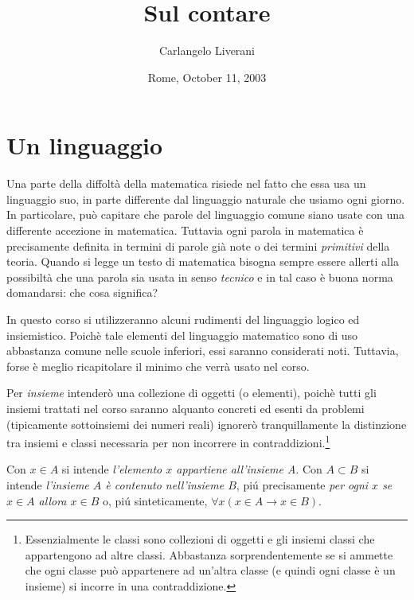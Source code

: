 \documentclass{amsart}
\begin{document}
\title{\bfseries Sul contare}
\author{Carlangelo Liverani}
\address{Dipartimento di Matematica\\
Universit\`{a} di Roma (Tor Vergata)\\
Via della Ricerca Scientifica, 00133 Roma, Italy\\
{\tt liverani@mat.uniroma2.it}}
\date{Rome, October 11, 2003}
\maketitle


\section{Un linguaggio}\label{sec:zero}
Una parte della diffolt\`a della matematica risiede nel fatto che essa
usa un linguaggio suo, in parte differente dal linguaggio naturale che
usiamo ogni giorno. In particolare, pu\`o capitare che parole del
linguaggio comune siano usate con una differente accezione in
matematica. Tuttavia ogni parola in matematica \`e precisamente
definita in termini di parole gi\`a note o dei termini {\em primitivi}
della teoria. Quando si legge un testo di matematica bisogna sempre
essere allerti alla possibilt\`a che una parola sia usata in senso
{\em tecnico} e in tal caso \`e buona norma domandarsi: che cosa
significa?


In questo corso si utilizzeranno
alcuni rudimenti del linguaggio logico  ed insiemistico. Poich\`e tale
elementi del linguaggio matematico sono di
uso abba\-stanza comune nelle scuole inferiori, essi saranno considerati
noti. Tuttavia, forse \`e meglio ricapitolare il minimo che verr\`a
usato nel corso. 

Per \emph{insieme} intender\`o una collezione di oggetti (o elementi),
poich\`e tutti gli 
insiemi trattati nel corso saranno alquanto concreti ed esenti da
problemi (tipicamente sottoinsiemi dei numeri reali) ignorer\`o
tranquillamente la distinzione tra insiemi e classi necessaria per non incorrere in
contraddizioni.\footnote{Essenzialmente le classi sono 
collezioni di oggetti e gli insiemi classi che appartengono ad altre
classi. Abbastanza sorprendentemente se si ammette che ogni classe pu\`o
appartenere ad un'altra classe (e quindi ogni classe \`e un insieme)
si incorre in una contraddizione.} 

Con $x\in A$ si intende
\emph{l'elemento $x$ appartiene all'insieme A}. Con $A\subset B$ si
intende \emph{l'insieme $A$ \`e contenuto nell'insieme $B$}, pi\'u
precisamente \emph{per ogni $x$ se $x\in A$ allora $x\in B$} o, pi\'u
sinteticamente, $\forall x(x \in A \rightarrow x\in B)$. 
\end{document}
